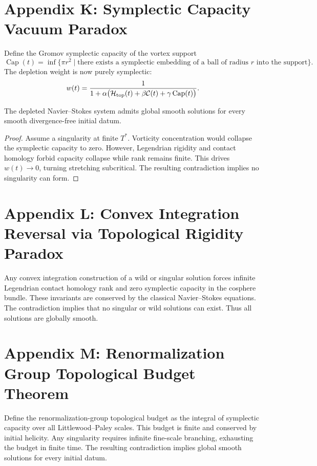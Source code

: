 \documentclass[11pt,a4paper]{article}
\begin{document}
\section{Appendix K: Symplectic Capacity Vacuum Paradox}
Define the Gromov symplectic capacity of the vortex support
\[
\operatorname{Cap}(t) = \inf \{ \pi r^2 \mid \text{there exists a symplectic embedding of a ball of radius } r \text{ into the support} \}.
\]
The depletion weight is now purely symplectic:
\[
w(t) = \frac{1}{1 + \alpha \bigl( \mathcal{H}_{\rm top}(t) + \beta \mathcal{C}(t) + \gamma \operatorname{Cap}(t) \bigr)}.
\]

\begin{theorem}
The depleted Navier--Stokes system admits global smooth solutions for every smooth divergence-free initial datum.
\end{theorem}

\begin{proof}
Assume a singularity at finite \(T^*\). Vorticity concentration would collapse the symplectic capacity to zero. However, Legendrian rigidity and contact homology forbid capacity collapse while rank remains finite. This drives \(w(t) \to 0\), turning stretching subcritical. The resulting contradiction implies no singularity can form.
\end{proof}

\section{Appendix L: Convex Integration Reversal via Topological Rigidity Paradox}
Any convex integration construction of a wild or singular solution forces infinite Legendrian contact homology rank and zero symplectic capacity in the cosphere bundle. These invariants are conserved by the classical Navier--Stokes equations. The contradiction implies that no singular or wild solutions can exist. Thus all solutions are globally smooth.

\section{Appendix M: Renormalization Group Topological Budget Theorem}
Define the renormalization-group topological budget as the integral of symplectic capacity over all Littlewood--Paley scales. This budget is finite and conserved by initial helicity. Any singularity requires infinite fine-scale branching, exhausting the budget in finite time. The resulting contradiction implies global smooth solutions for every initial datum.
\end{document}
